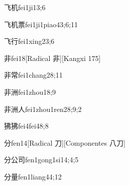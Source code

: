 \begin{verbete}{飞机}{fei1ji1}{3;6}
\end{verbete}

\begin{verbete}{飞机票}{fei1ji1piao4}{3;6;11}
\end{verbete}

\begin{verbete}{飞行}{fei1xing2}{3;6}
\end{verbete}

\begin{verbete}{非}{fei1}{8}[Radical ⾮][Kangxi 175]
\end{verbete}

\begin{verbete}{非常}{fei1chang2}{8;11}
\end{verbete}

\begin{verbete}{非洲}{fei1zhou1}{8;9}
\end{verbete}

\begin{verbete}{非洲人}{fei1zhou1ren2}{8;9;2}
\end{verbete}

\begin{verbete}{狒狒}{fei4fei4}{8;8}
\end{verbete}

\begin{verbete}{分}{fen1}{4}[Radical ⼑][Componentes ⼋⼑]
\end{verbete}

\begin{verbete}{分公司}{fen1gong1si1}{4;4;5}
\end{verbete}

\begin{verbete}{分量}{fen1liang4}{4;12}
\end{verbete}


